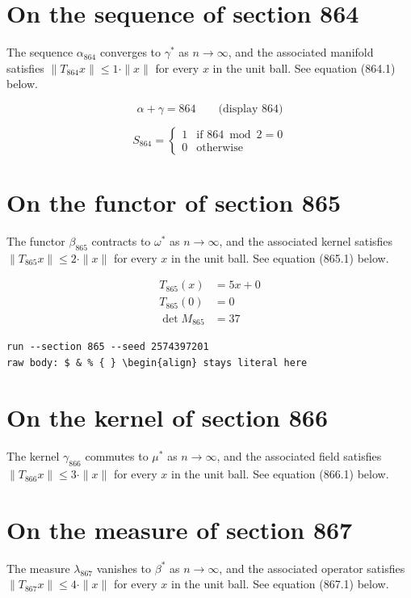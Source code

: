 \documentclass{article}
\begin{document}
\section{On the sequence of section 864}
The sequence $\alpha_{864}$ converges to $\gamma^{*}$ as $n \to \infty$,
and the associated manifold satisfies $\|T_{864} x\| \leq 1 \cdot \|x\|$
for every $x$ in the unit ball. See equation (864.1) below.

$$
\alpha + \gamma = 864 \qquad \text{(display 864)}
$$

\begin{equation}
S_{864} = \begin{cases} 1 & \text{if } 864 \bmod 2 = 0 \\ 0 & \text{otherwise} \end{cases}
\end{equation}

\section{On the functor of section 865}
The functor $\beta_{865}$ contracts to $\omega^{*}$ as $n \to \infty$,
and the associated kernel satisfies $\|T_{865} x\| \leq 2 \cdot \|x\|$
for every $x$ in the unit ball. See equation (865.1) below.

\begin{align}
T_{865}(x) &= 5 x + 0 \\
T_{865}(0) &= 0 \\
\det M_{865} &= 37
\end{align}

\begin{verbatim}
run --section 865 --seed 2574397201
raw body: $ & % { } \begin{align} stays literal here
\end{verbatim}

\section{On the kernel of section 866}
The kernel $\gamma_{866}$ commutes to $\mu^{*}$ as $n \to \infty$,
and the associated field satisfies $\|T_{866} x\| \leq 3 \cdot \|x\|$
for every $x$ in the unit ball. See equation (866.1) below.

\section{On the measure of section 867}
The measure $\lambda_{867}$ vanishes to $\beta^{*}$ as $n \to \infty$,
and the associated operator satisfies $\|T_{867} x\| \leq 4 \cdot \|x\|$
for every $x$ in the unit ball. See equation (867.1) below.
\end{document}
